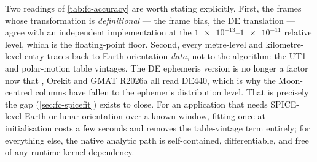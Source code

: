 Two readings of \cref{tab:fc-accuracy} are worth stating explicitly. First,
the frames whose transformation is \emph{definitional} --- the frame bias,
the DE translation --- agree with an independent implementation at the
$\num{1e-13}$--$\num{1e-11}$ relative level, which is the floating-point floor.
Second, every metre-level and kilometre-level entry traces back to
Earth-orientation \emph{data}, not to the algorithm: the UT1 and
polar-motion table vintages. The DE ephemeris version is no longer a factor
now that \lupnt{}, Orekit and GMAT R2026a all read DE440, which is why the
Moon-centred columns have fallen to the ephemeris distribution level. That is
precisely the gap
 (\cref{sec:fc-spicefit}) exists to close.
For an application that needs SPICE-level Earth or lunar orientation over a
known window, fitting once at initialisation costs a few seconds and removes
the table-vintage term entirely; for everything else, the native analytic
path is self-contained, differentiable, and free of any runtime kernel
dependency.
